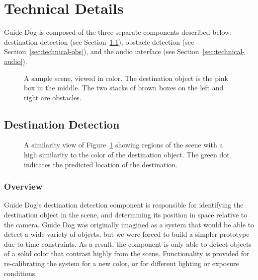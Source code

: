 \vfill\eject

\section{Technical Details}
\label{sec:technical}

Guide Dog is composed of the three separate components described below: destination detection
(see Section~\ref{sec:technical-dest}),
obstacle detection (see Section~\ref{sec:technical-obs}), and the audio
interface (see Section~\ref{sec:technical-audio}).

\begin{figure}
\caption{A sample scene, viewed in color. The destination object is the pink box
  in the middle. The two stacks of brown boxes on the left and right are
  obstacles.}
\label{fig:color}
\end{figure}

\subsection{Destination Detection}
\label{sec:technical-dest}

\begin{figure}
\caption{A similarity view of Figure~\ref{fig:color} showing regions of the scene with a high similarity
to the color of the destination object. The green dot indicates the predicted location of the destination.}
\label{fig:destination}
\end{figure}

\subsubsection{Overview}
\label{sec:technical-dest-overview}

Guide Dog's destination detection component is responsible for identifying the
destination object in the scene, and determining its position in space
relative to the camera. Guide Dog was originally imagined as a system that
would be able to detect a wide variety of objects, but we were forced to
build a simpler prototype due to time constraints. As a result, the component 
is only able to detect objects of a solid color that contrast highly from the 
scene. Functionality is provided for re-calibrating the system for a new color, 
or for different lighting or exposure conditions. 

